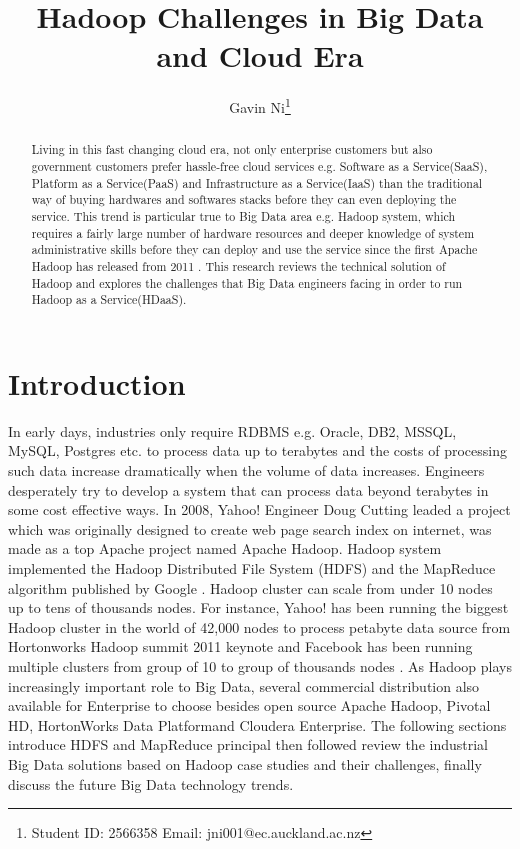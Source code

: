 \documentclass[11pt, oneside]{article}   	%
\title{Hadoop Challenges in Big Data and Cloud Era}
\author{Gavin Ni\thanks{Student ID: 2566358 Email: jni001@ec.auckland.ac.nz}}
\begin{document}
\maketitle
\begin{abstract}
  Living in this fast changing cloud era, not only enterprise customers but also government customers prefer hassle-free cloud services e.g. Software as a Service(SaaS), Platform as a Service(PaaS) and Infrastructure as a Service(IaaS) than the traditional way of buying hardwares and softwares stacks before they can even deploying the service. This trend is particular true to Big Data area e.g. Hadoop system, which requires a fairly large number of hardware resources and deeper knowledge of system administrative skills before they can deploy and use the service since the first Apache Hadoop has released from 2011 . This research reviews the technical solution of Hadoop and explores the challenges that Big Data engineers facing in order to run Hadoop as a Service(HDaaS).     
\end{abstract}
\section{Introduction}
  In early days, industries only require RDBMS e.g. Oracle, DB2, MSSQL, MySQL, Postgres etc. to process data up to terabytes and the costs of processing such data increase dramatically when the volume of data increases. Engineers desperately try to develop a system that can process data beyond terabytes in some cost effective ways. In 2008, Yahoo! Engineer Doug Cutting leaded a project which was originally designed to create web page search index on internet, was made as a top Apache project named Apache Hadoop\texttrademark {}. Hadoop system implemented the Hadoop Distributed File System (HDFS) and the MapReduce algorithm published by Google . Hadoop cluster can scale from under 10 nodes up to tens of thousands nodes. For instance, Yahoo!  has been running the biggest Hadoop cluster in the world of 42,000 nodes to process petabyte data source from Hortonworks Hadoop summit 2011 keynote and Facebook has been running multiple clusters from group of 10 to group of thousands nodes . As Hadoop plays increasingly important role to Big Data, several commercial distribution also available for Enterprise to choose besides open source Apache Hadoop\texttrademark, Pivotal HD\texttrademark, HortonWorks Data Platform\texttrademark and Cloudera Enterprise\texttrademark. The following sections introduce HDFS and MapReduce principal then followed review the industrial Big Data solutions based on Hadoop case studies and their challenges, finally discuss the future Big Data technology trends.
\end{document}
